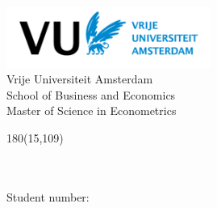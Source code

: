 \begin{titlepage}
\begin{center}
\includegraphics[height=2cm]{figures/Vu logo.png}\\
\vspace*{10mm}
\large
Vrije Universiteit Amsterdam\\
School of Business and Economics\\
Master of Science in Econometrics\\


\vspace*{10cm}

\setlength{\TPHorizModule}{1mm}
\setlength{\TPVertModule}{\TPHorizModule}
\newlength{\backupparindent}
\setlength{\backupparindent}{\parindent}
\setlength{\parindent}{0mm}			
\begin{textblock}{180}(15,109)

    \vspace*{1mm}
    \Large
    \centering
    \textbf{\doctitle \\}
    \vspace*{10mm}
    \Large
    \me\\
    Student number: \stnumbr\\
    \vspace*{5cm}
   

\end{textblock}
\end{center}
\end{titlepage}
